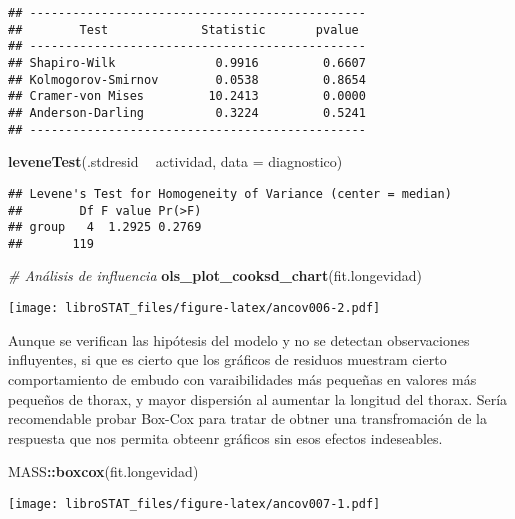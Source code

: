 \documentclass[
]{book}
\newenvironment{Shaded}{\begin{snugshade}}{\end{snugshade}}
\newcommand{\CommentTok}[1]{\textcolor[rgb]{0.56,0.35,0.01}{\textit{#1}}}
\newcommand{\DataTypeTok}[1]{\textcolor[rgb]{0.13,0.29,0.53}{#1}}
\newcommand{\KeywordTok}[1]{\textcolor[rgb]{0.13,0.29,0.53}{\textbf{#1}}}
\newcommand{\NormalTok}[1]{#1}
\newcommand{\OperatorTok}[1]{\textcolor[rgb]{0.81,0.36,0.00}{\textbf{#1}}}
\newcommand{\StringTok}[1]{\textcolor[rgb]{0.31,0.60,0.02}{#1}}
\theoremstyle{definition}
\theoremstyle{definition}
\theoremstyle{definition}
\theoremstyle{remark}
\begin{document}
\begin{verbatim}
## -----------------------------------------------
##        Test             Statistic       pvalue  
## -----------------------------------------------
## Shapiro-Wilk              0.9916         0.6607 
## Kolmogorov-Smirnov        0.0538         0.8654 
## Cramer-von Mises         10.2413         0.0000 
## Anderson-Darling          0.3224         0.5241 
## -----------------------------------------------
\end{verbatim}

\begin{Shaded}
\begin{Highlighting}[]
\KeywordTok{leveneTest}\NormalTok{(.stdresid }\OperatorTok{~}\StringTok{ }\NormalTok{actividad, }\DataTypeTok{data =}\NormalTok{ diagnostico)}
\end{Highlighting}
\end{Shaded}

\begin{verbatim}
## Levene's Test for Homogeneity of Variance (center = median)
##        Df F value Pr(>F)
## group   4  1.2925 0.2769
##       119
\end{verbatim}

\begin{Shaded}
\begin{Highlighting}[]
\CommentTok{# Análisis de influencia}
\KeywordTok{ols_plot_cooksd_chart}\NormalTok{(fit.longevidad)}
\end{Highlighting}
\end{Shaded}

\texttt{[image: libroSTAT\_files/figure-latex/ancov006-2.pdf]}

Aunque se verifican las hipótesis del modelo y no se detectan observaciones influyentes, si que es cierto que los gráficos de residuos muestram cierto comportamiento de embudo con varaibilidades más pequeñas en valores más pequeños de thorax, y mayor dispersión al aumentar la longitud del thorax. Sería recomendable probar Box-Cox para tratar de obtner una transfromación de la respuesta que nos permita obteenr gráficos sin esos efectos indeseables.

\begin{Shaded}
\begin{Highlighting}[]
\NormalTok{MASS}\OperatorTok{::}\KeywordTok{boxcox}\NormalTok{(fit.longevidad)}
\end{Highlighting}
\end{Shaded}

\texttt{[image: libroSTAT\_files/figure-latex/ancov007-1.pdf]}
\end{document}
